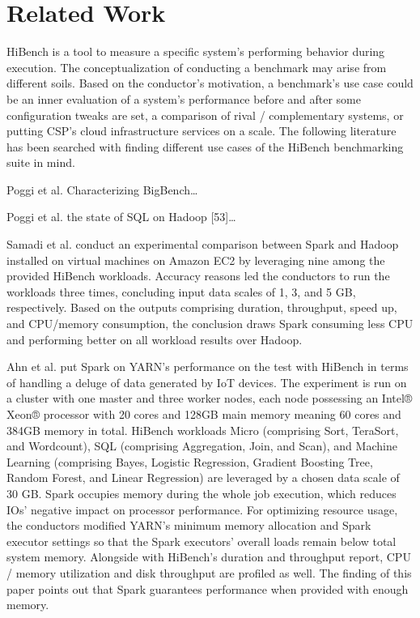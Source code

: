 \documentclass[review]{elsarticle}
\begin{document}
\section{Related Work}
HiBench is a tool to measure a specific system's performing behavior during execution. The conceptualization of conducting a benchmark may arise from different soils. Based on the conductor's motivation, a benchmark's use case could be an inner evaluation of a system's performance before and after some configuration tweaks are set, a comparison of rival / complementary systems, or putting CSP's cloud infrastructure services on a scale. The following literature has been searched with finding different use cases of the HiBench benchmarking suite in mind.

Poggi et al. \cite{poggi_characterizing_2018} Characterizing BigBench…

Poggi et al. \cite{poggi_state_2016} the state of SQL on Hadoop [53]…

Samadi et al. \cite{samadi_performance_2018} conduct an experimental comparison between Spark and Hadoop installed on virtual machines on Amazon EC2 by leveraging nine among the provided HiBench workloads. Accuracy reasons led the conductors to run the workloads three times, concluding input data scales of 1, 3, and 5 GB, respectively. Based on the outputs comprising duration, throughput, speed up, and CPU/memory consumption, the conclusion draws Spark consuming less CPU and performing better on all workload results over Hadoop. 

Ahn et al. \cite{ahn_performance_2018} put Spark on YARN's performance on the test with HiBench in terms of handling a deluge of data generated by IoT devices. The experiment is run on a cluster with one master and three worker nodes, each node possessing an Intel® Xeon® processor with 20 cores and 128GB main memory meaning 60 cores and 384GB memory in total. HiBench workloads Micro (comprising Sort, TeraSort, and Wordcount), SQL (comprising Aggregation, Join, and Scan), and Machine Learning (comprising Bayes, Logistic Regression, Gradient Boosting Tree, Random Forest, and Linear Regression) are leveraged by a chosen data scale of 30 GB. Spark occupies memory during the whole job execution, which reduces IOs' negative impact on processor performance. For optimizing resource usage, the conductors modified YARN's minimum memory allocation and Spark executor settings so that the Spark executors' overall loads remain below total system memory. Alongside with HiBench's duration and throughput report, CPU / memory utilization and disk throughput are profiled as well. The finding of this paper points out that Spark guarantees performance when provided with enough memory.
\end{document}
